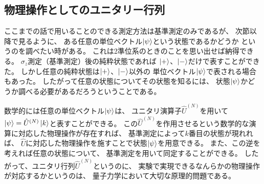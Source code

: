 \documentclass[a4paper, 10pt]{jsarticle}
\begin{document}
\subsection{物理操作としてのユニタリー行列}
ここまでの話で用いることのできる測定方法は基準測定のみであるが、
次節以降で見るように、
ある任意の単位ベクトル$\Ket{\psi}$という状態であるかどうか
というのを調べたい時がある。
これは2準位系のときのことを思い出せば納得できる。
$\sigma_z$測定（基準測定）後の純粋状態であれば
$\Ket{+}$、$\Ket{-}$だけで表すことができた。
しかし任意の純粋状態は$\Ket{+}$、$\Ket{-}$以外の
単位ベクトル$\Ket{\psi}$で表される場合もあった。
したがって任意の状態についてその状態を知るには、
状態$\Ket{\psi}$かどうか調べる必要があるだろうということである。

数学的には任意の単位ベクトル$\Ket{\psi}$は、
ユニタリ演算子$\hat{U}^{(N)}$を用いて
$\Ket{\psi} = \hat{U}^{(N)} \Ket{k}$と表すことができる。
この$\hat{U}^{(N)}$を作用させるという数学的な演算に対応した物理操作が存在すれば、
基準測定によって$k$番目の状態が現れれば、
$\hat{U}$に対応した物理操作を施すことで状態$\Ket{\psi}$を用意できる。
また、この逆を考えれば任意の状態について、
基準測定を用いて同定することができる。
したがって、ユニタリ行列$\hat{U}^{(N)}$というのに、
実験で実現できるなんらかの物理操作が対応するかというのは、
量子力学において大切な原理的問題である。
\end{document}
